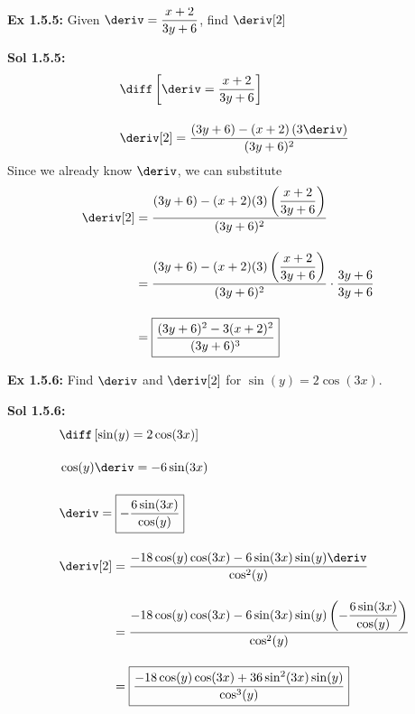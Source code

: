 \begin{tcolorbox}[example]
    \textbf{Ex 1.5.5: } Given $\deriv = \dfrac{x + 2}{3y + 6}$, find $\deriv[2]$
\end{tcolorbox}
\begin{tcolorbox}[solution]
    \textbf{Sol 1.5.5: } \begin{align*}
        & \diff \left[\deriv = \dfrac{x + 2}{3y + 6}\right] \\[11pt]
        & \deriv[2] = \dfrac{(3y + 6) - (x + 2)\left(3\deriv\right)}{(3y + 6)^2} 
    \end{align*}
    Since we already know $\deriv$, we can substitute \begin{align*}
        & \deriv[2] \begin{aligned}[t]
            & = \dfrac{(3y + 6) - (x + 2)(3)\left(\dfrac{x + 2}{3y + 6}\right)}{(3y + 6)^2} \\[11pt]
            & = \dfrac{(3y + 6) - (x + 2)(3)\left(\dfrac{x + 2}{3y + 6}\right)}{(3y + 6)^2} \cdot \dfrac{3y + 6}{3y + 6} \\[11pt]
            & = \boxed{\dfrac{(3y + 6)^2 - 3(x + 2)^2}{(3y + 6)^3}}
        \end{aligned}
    \end{align*}
\end{tcolorbox} \vspace{11pt}

\begin{tcolorbox}[example]
    \textbf{Ex 1.5.6: } Find $\deriv$ and $\deriv[2]$ for $\sin (y) = 2\cos (3x)$.
\end{tcolorbox}
\begin{tcolorbox}[solution]
    \textbf{Sol 1.5.6: } \begin{align*}
        & \diff \left[\sin (y) = 2\cos (3x)\right] \\[11pt]
        & \cos (y)\deriv = -6\sin (3x) \\[11pt]
        & \deriv = \boxed{-\dfrac{6\sin (3x)}{\cos (y)}} \\[11pt]
        & \deriv[2] \begin{aligned}[t]
            & = \dfrac{-18\cos (y)\cos (3x) - 6\sin (3x)\sin (y)\deriv}{\cos^2 (y)} \\[11pt]
            & = \dfrac{-18\cos (y)\cos (3x) - 6\sin (3x)\sin (y)\left(-\dfrac{6\sin (3x)}{\cos (y)}\right)}{\cos^2 (y)} \\[11pt]
            & = \boxed{\dfrac{-18\cos (y)\cos (3x) + 36\sin^2 (3x)\sin (y)}{\cos^3 (y)}}
        \end{aligned}
    \end{align*}
\end{tcolorbox}

